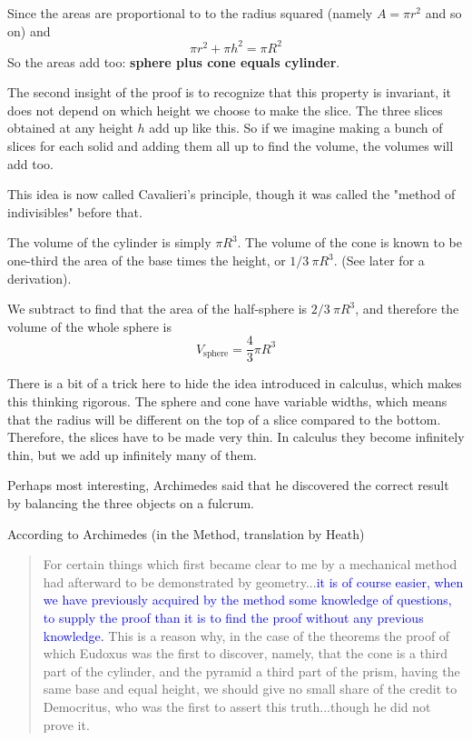 \documentclass[11pt, oneside]{article}
\begin{document}
Since the areas are proportional to to the radius squared (namely $A = \pi r^2$ and so on) and
\[ \pi r^2 + \pi h^2 = \pi R^2 \]
So the areas add too:  \textbf{sphere plus cone equals cylinder}.

The second insight of the proof is to recognize that this property is invariant, it does not depend on which height we choose to make the slice.  The three slices obtained at any height $h$ add up like this.  So if we imagine making a bunch of slices for each solid and adding them all up to find the volume, the volumes will add too.

This idea is now called Cavalieri's principle, though it was called the "method of indivisibles" before that.

The volume of the cylinder is simply $\pi R^3$.  The volume of the cone is known to be one-third the area of the base times the height, or $1/3 \ \pi R^3$.  (See later for a derivation).

We subtract to find that the area of the half-sphere is $2/3 \ \pi R^3$, and therefore the volume of the whole sphere is
\[ V_{\text{sphere}} = \frac{4}{3} \pi R^3 \]

There is a bit of a trick here to hide the idea introduced in calculus, which makes this thinking rigorous.  The sphere and cone have variable widths, which means that the radius will be different on the top of a slice compared to the bottom.  Therefore, the slices have to be made very thin.  In calculus they become infinitely thin, but we add up infinitely many of them.

Perhaps most interesting, Archimedes said that he discovered the correct result by balancing the three objects on a fulcrum.  

According to Archimedes (in the Method, translation by Heath)

\begin{quote}For certain things which first became clear to me by a mechanical method had afterward to be demonstrated by geometry...\textcolor{blue}{it is of course easier, when we have previously acquired by the method some knowledge of questions, to supply the proof than it is to find the proof without any previous knowledge.} This is a reason why, in the case of the theorems the proof of which Eudoxus was the first to discover, namely, that the cone is a third part of the cylinder, and the pyramid a third part of the prism, having the same base and equal height, we should give no small share of the credit to Democritus, who was the first to assert this truth...though he did not prove it.
\end{quote}
\end{document}
